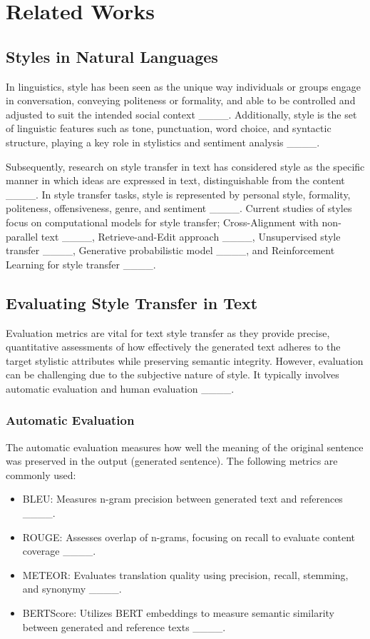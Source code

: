 \section{Related Works}
\label{sec:related_works}

\subsection{Styles in Natural Languages}
In linguistics, style has been seen as the unique way individuals or groups engage in conversation, conveying politeness or formality, and able to be controlled and adjusted to suit the intended social context ____. Additionally, style is the set of linguistic features such as tone, punctuation, word choice, and syntactic structure, playing a key role in stylistics and sentiment analysis ____. 

Subsequently, research on style transfer in text has considered style as the specific manner in which ideas are expressed in text, distinguishable from the content ____. In style transfer tasks, style is represented by personal style, formality, politeness, offensiveness, genre, and sentiment ____. Current studies of styles focus on computational models for style transfer; Cross-Alignment with non-parallel text ____, Retrieve-and-Edit approach ____, Unsupervised style transfer ____, Generative probabilistic model ____, and Reinforcement Learning for style transfer ____.

\subsection{Evaluating Style Transfer in Text}
Evaluation metrics are vital for text style transfer as they provide precise, quantitative assessments of how effectively the generated text adheres to the target stylistic attributes while preserving semantic integrity. However, evaluation can be challenging due to the subjective nature of style. It typically involves automatic evaluation and human evaluation ____.

\subsubsection{Automatic Evaluation}
The automatic evaluation measures how well the meaning of the original sentence was preserved in the output (generated sentence). The following metrics are commonly used:
\begin{itemize}
    \item BLEU: Measures n-gram precision between generated text and references ____.
    \item ROUGE: Assesses overlap of n-grams, focusing on recall to evaluate content coverage ____.
    \item METEOR: Evaluates translation quality using precision, recall, stemming, and synonymy ____.
    \item BERTScore: Utilizes BERT embeddings to measure semantic similarity between generated and reference texts ____.
\end{itemize}

